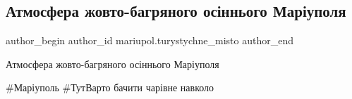  
 
 
 
 

\subsection{Атмосфера жовто-багряного осіннього Маріуполя}
\label{sec:11_10_2021.fb.mariupol.turystychne_misto.1.atmosfera_zhovto_bagrjanogo_osinnogo_mariupolja}

\ifcmt
 author_begin
   author_id mariupol.turystychne_misto
 author_end
\fi

Атмосфера жовто-багряного осіннього Маріуполя 🍂

\#Маріуполь \#ТутВарто бачити чарівне навколо
